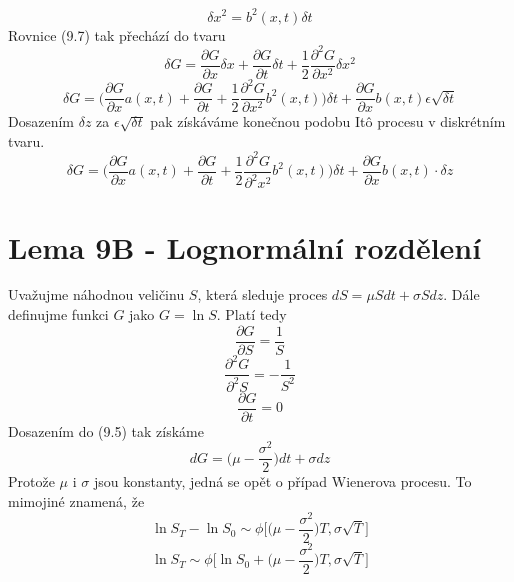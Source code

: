 \documentclass[a4paper]{book}
\begin{document}
\begin{equation*}
\delta x^2 = b^2(x,t) \delta t
\end{equation*}
Rovnice (9.7) tak přechází do tvaru
\begin{equation*}
\delta G = \frac{\partial G}{\partial x}\delta x + \frac{\partial G}{\partial t}\delta t + \frac{1}{2}\frac{\partial^2 G}{\partial x^2}\delta x^2
\end{equation*}
\begin{equation*}
\delta G = \bigg( \frac{\partial G}{\partial x}a(x,t) + \frac{\partial G}{\partial t} + \frac{1}{2} \frac{\partial^2 G}{\partial x^2}b^2(x,t) \bigg) \delta t + \frac{\partial G}{\partial x} b(x,t) \epsilon \sqrt{\delta t}
\end{equation*}
Dosazením $\delta z$ za $\epsilon \sqrt{\delta t}$ pak získáváme konečnou podobu It\^o procesu v diskrétním tvaru.
\begin{equation*}
\delta G = \bigg( \frac{\partial G}{\partial x}a(x,t) + \frac{\partial G}{\partial t} + \frac{1}{2} \frac{\partial^2 G}{\partial^2 x^2}b^2(x,t) \bigg) \delta t + \frac{\partial G}{\partial x}b(x,t) \cdot \delta z
\end{equation*}

\section{Lema 9B - Lognormální rozdělení}

Uvažujme náhodnou veličinu $S$, která sleduje proces $d S = \mu S dt + \sigma S dz$. Dále definujme funkci $G$ jako $G = \ln S$. Platí tedy
\begin{equation*}
\frac{\partial G}{\partial S} = \frac{1}{S}
\end{equation*}
\begin{equation*}
\frac{\partial^2 G}{\partial^2 S} = -\frac{1}{S^2}
\end{equation*}
\begin{equation*}
\frac{\partial G}{\partial t} = 0
\end{equation*}
Dosazením do (9.5) tak získáme
\begin{equation*}
d G = \big( \mu - \frac{\sigma^2}{2} \big) dt + \sigma dz
\end{equation*}
Protože $\mu$ i $\sigma$ jsou konstanty, jedná se opět o případ Wienerova procesu. To mimojiné znamená, že
\begin{equation*}
\ln S_T - \ln S_0 \sim \phi \bigg[\big(\mu - \frac{\sigma^2}{2} \big)T, \sigma \sqrt{T} \bigg] 
\end{equation*}
\begin{equation*}
\ln S_T \sim \phi \bigg[\ln S_0 + \big(\mu - \frac{\sigma^2}{2} \big)T, \sigma \sqrt{T} \bigg]
\end{equation*}
\end{document}
